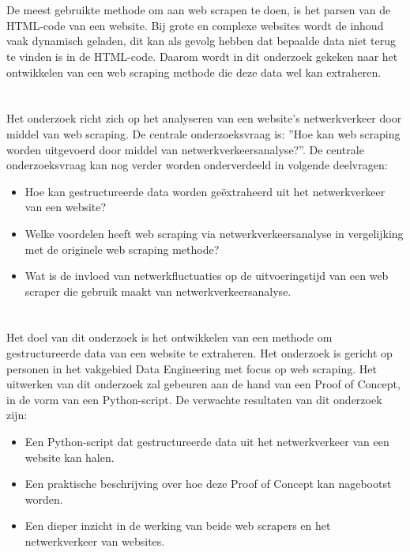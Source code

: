 \section{}%
\label{sec:probleemstelling}
De meest gebruikte methode om aan web scrapen te doen, is het parsen van de HTML-code van een website. Bij grote en complexe websites wordt de inhoud vaak dynamisch geladen, dit kan als gevolg hebben dat bepaalde data niet terug te vinden is in de HTML-code. Daarom wordt in dit onderzoek gekeken naar het ontwikkelen van een web scraping methode die deze data wel kan extraheren.

\section{}%
\label{sec:onderzoeksvraag}
Het onderzoek richt zich op het analyseren van een website's netwerkverkeer door middel van web scraping. De centrale onderzoeksvraag is: ''Hoe kan web scraping worden uitgevoerd door middel van netwerkverkeersanalyse?''. De centrale onderzoeksvraag kan nog verder worden onderverdeeld in volgende deelvragen:
\begin{itemize}
    \item Hoe kan gestructureerde data worden geëxtraheerd uit het netwerkverkeer van een website?

    \item Welke voordelen heeft web scraping via netwerkverkeersanalyse in vergelijking met de originele web scraping methode?

    \item Wat is de invloed van netwerkfluctuaties op de uitvoeringstijd van een web scraper die gebruik maakt van netwerkverkeersanalyse.
\end{itemize}



\section{}%
\label{sec:onderzoeksdoelstelling}
Het doel van dit onderzoek is het ontwikkelen van een methode om gestructureerde data van een website te extraheren. Het onderzoek is gericht op personen in het vakgebied Data Engineering met focus op web scraping. Het uitwerken van dit onderzoek zal gebeuren aan de hand van een Proof of Concept, in de vorm van een Python-script. De verwachte resultaten van dit onderzoek zijn:
\begin{itemize}
    \item Een Python-script dat gestructureerde data uit het netwerkverkeer van een website kan halen.

    \item Een praktische beschrijving over hoe deze Proof of Concept kan nagebootst worden.

    \item Een dieper inzicht in de werking van beide web scrapers en het netwerkverkeer van websites.
\end{itemize}

